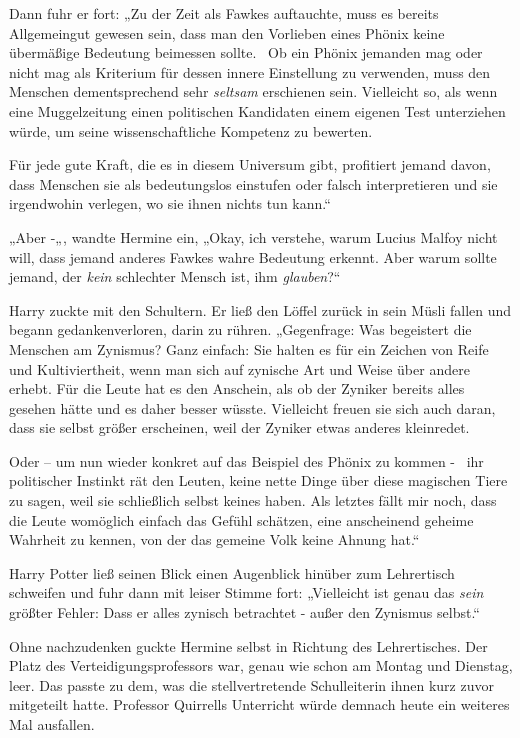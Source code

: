{Dann fuhr er fort: „Zu der Zeit als Fawkes auftauchte, muss es bereits Allgemeingut gewesen sein, dass man den Vorlieben eines Phönix keine übermäßige Bedeutung beimessen sollte. ~Ob ein Phönix jemanden mag oder nicht mag als Kriterium für dessen innere Einstellung zu verwenden, muss den Menschen dementsprechend sehr \emph{seltsam} erschienen sein. Vielleicht so, als wenn eine Muggelzeitung einen politischen Kandidaten einem eigenen Test unterziehen würde, um seine wissenschaftliche Kompetenz zu bewerten.

Für jede gute Kraft, die es in diesem Universum gibt, profitiert jemand davon, dass Menschen sie als bedeutungslos einstufen oder falsch interpretieren und sie irgendwohin verlegen, wo sie ihnen nichts tun kann.“

„Aber -„, wandte Hermine ein, „Okay, ich verstehe, warum Lucius Malfoy nicht will, dass jemand anderes Fawkes wahre Bedeutung erkennt. Aber warum sollte jemand, der \emph{kein} schlechter Mensch ist, ihm \emph{glauben}?“

Harry zuckte mit den Schultern. Er ließ den Löffel zurück in sein Müsli fallen und begann gedankenverloren, darin zu rühren. „Gegenfrage: Was begeistert die Menschen am Zynismus? Ganz einfach: Sie halten es für ein Zeichen von Reife und Kultiviertheit, wenn man sich auf zynische Art und Weise über andere erhebt. Für die Leute hat es den Anschein, als ob der Zyniker bereits alles gesehen hätte und es daher besser wüsste. Vielleicht freuen sie sich auch daran, dass sie selbst größer erscheinen, weil der Zyniker etwas anderes kleinredet.

Oder -- um nun wieder konkret auf das Beispiel des Phönix zu kommen - ~ihr politischer Instinkt rät den Leuten, keine nette Dinge über diese magischen Tiere zu sagen, weil sie schließlich selbst keines haben. Als letztes fällt mir noch, dass die Leute womöglich einfach das Gefühl schätzen, eine anscheinend geheime Wahrheit zu kennen, von der das gemeine Volk keine Ahnung hat.“

Harry Potter ließ seinen Blick einen Augenblick hinüber zum Lehrertisch schweifen und fuhr dann mit leiser Stimme fort: „Vielleicht ist genau das \emph{sein} größter Fehler: Dass er alles zynisch betrachtet - außer den Zynismus selbst.“

Ohne nachzudenken guckte Hermine selbst in Richtung des Lehrertisches. Der Platz des Verteidigungsprofessors war, genau wie schon am Montag und Dienstag, leer. Das passte zu dem, was die stellvertretende Schulleiterin ihnen kurz zuvor mitgeteilt hatte. Professor Quirrells Unterricht würde demnach heute ein weiteres Mal ausfallen.

}
